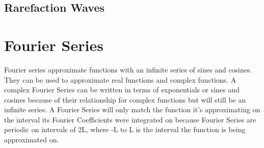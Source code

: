\documentclass{article}
\newcommand{\blue}[1]{\textcolor{blue}{#1}}
\begin{document}
\subsection{Rarefaction Waves}

\section{Fourier Series}
Fourier series approximate functions with an infinite series of sines and cosines. They can be used to approximate real functions and complex functions. A complex Fourier Series can be written in terms of exponentials or sines and cosines because of their relationship for complex functions but will still be an infinite series. \newline
A Fourier Series will only match the function it's approximating on the interval its Fourier Coefficients were integrated on because Fourier Series are periodic on intervals of 2L, where -L to L is the interval the function is being approximated on. 
\end{document}
